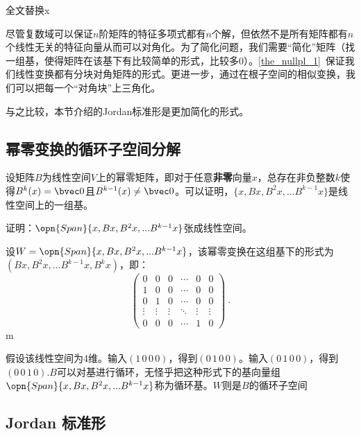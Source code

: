 

\begin{issues}
\issueDraft 全文替换x
\end{issues}
尽管复数域可以保证$n$阶矩阵的特征多项式都有$n$个解，但依然不是所有矩阵都有$n$个线性无关的特征向量从而可以对角化。为了简化问题，我们需要“简化”矩阵（找一组基，使得矩阵在该基下有比较简单的形式，比较多$0$）。\autoref{the_nullpl_1}~保证我们线性变换都有分块对角矩阵的形式。更进一步，通过在根子空间的相似变换，我们可以把每一个“对角块”上三角化。

与之比较，本节介绍的Jordan标准形是更加简化的形式。
\subsection{幂零变换的循环子空间分解}
设矩阵$B$为线性空间$V$上的幂零矩阵，即对于任意\textbf{非零}向量$x$，总存在非负整数$k$使得$B^{k}(x)=\bvec 0$且$B^{k-1}(x)\neq \bvec 0$。可以证明，$\{x,Bx,B^2x,...B^{k-1}x\}$是线性空间上的一组基。
\begin{exercise}{}
证明：$\opn{Span}\{x,Bx,B^2x,...B^{k-1}x\}$张成线性空间。
\end{exercise}
设$W=\opn{Span}\{x,Bx,B^2x,...B^{k-1}x\}$，该幂零变换在这组基下的形式为$(Bx,B^2x,...B^{k-1}x,B^kx)$，即：
\begin{equation}
\left(\begin{array}{cccccc}
0 & 0 & 0 & \cdots & 0 & 0 \\
1 & 0 & 0 & \cdots & 0 & 0 \\
0 & 1 & 0 & \cdots & 0 & 0 \\
\vdots & \vdots & \vdots & \ddots & \vdots & \vdots \\
0 & 0 & 0 & \cdots & 1 & 0
\end{array}\right)~.
\end{equation}m

假设该线性空间为4维。输入$(1\,0\,0\,0)$，得到$(0\,1\,0\,0)$。输入$(0\,1\,0\,0)$，得到$(0\,0\,1\,0)$.$B$可以对基进行循环，无怪乎把这种形式下的基向量组$\opn{Span}\{x,Bx,B^2x,...B^{k-1}x\}$称为循环基。$W$则是$B$的循环子空间

\subsection{Jordan 标准形}